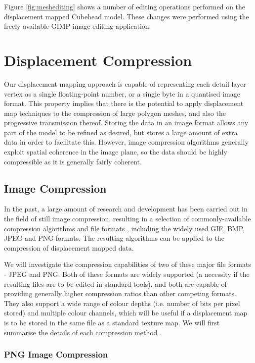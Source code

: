Figure \ref{fig:meshediting} shows a number of editing operations performed on the displacement mapped Cubehead model. These changes were performed using the freely-available GIMP image editing application.

\section{\label{sec:dispmapanim:compression}Displacement Compression}

Our displacement mapping approach is capable of representing each detail layer vertex as a single floating-point number, or a single byte in a quantised image format. This property implies that there is the potential to apply displacement map techniques to the compression of large polygon meshes, and also the progressive transmission thereof. Storing the data in an image format allows any part of the model to be refined as desired, but stores a large amount of extra data in order to facilitate this. However, image compression algorithms generally exploit spatial coherence in the image plane, so the data should be highly compressible as it is generally fairly coherent.

\subsection{\label{sec:dispmapanim:compression:images}Image Compression}

In the past, a large amount of research and development has been carried out in the field of still image compression, resulting in a selection of commonly-available compression algorithms and file formats \cite{Murray94}, including the widely used GIF, BMP, JPEG and PNG formats. The resulting algorithms can be applied to the compression of displacement mapped data.

We will investigate the compression capabilities of two of these major file formats - JPEG and PNG. Both of these formats are widely supported (a necessity if the resulting files are to be edited in standard tools), and both are capable of providing generally higher compression ratios than other competing formats. They also support a wide range of colour depths (i.e. number of bits per pixel stored) and multiple colour channels, which will be useful if a displacement map is to be stored in the same file as a standard texture map. We will first summarise the details of each compression method \cite{Miano99}.

\subsubsection{PNG Image Compression}


